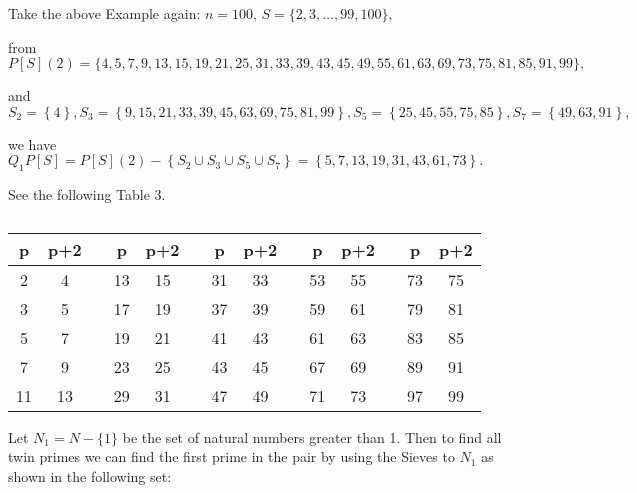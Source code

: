 \documentclass{aomart}
\begin{document}
\vspace{1\baselineskip}

Take the above Example again:  \( n = 100\),  \( S = \{ 2, 3, \ldots , 99, 100\} ,\)
\vspace{1\baselineskip}

from\ \ \ \ \( P\left[S\right]\left(2\right) = \{ 4,5,7,9,13,15,19,21,25,31,33,39,43,45,49,55,61,63,69,73,75,81,85,91,99\} ,\)
\vspace{1\baselineskip}

and\ \ \ \  \( S_{2} =\left\{ 4\right\} ,  S_{3} =\left\{ 9,15,21,33,39,45,63,69,75,81, 99\right\} ,  S_{5} =\left\{ 25,45,55,75,85\right\} ,  S_{7} =\left\{ 49,63,91\right\} ,\)
\vspace{1\baselineskip}

we have\ \ \ \ \ \ \ \ \(  Q_{1}P\left[S\right] = P\left[S\right](2)-\left\{ S_{2}\cup  S_{3}\cup  S_{5}\cup  S_{7}\right\}  =\left\{ 5, 7, 13, 19, 31, 43, 61, 73\right\} .\)

\vspace{2\baselineskip}

See the following Table 3.


\begin{table}[H]
\centering
\begin{tabular}{|c|c|c|c|c|c|c|c|c|c|c|c|c|c|}
\hline
p & p+2 &   & p & p+2 &   & p & p+2 &   & p & p+2 &   & p & p+2 \\ \hline
2 & \cellcolor{red!10} 4 &  & 13 & \cellcolor{red!30} 15 &  & 31 & \cellcolor{red!30} 33 &  & 53 & \cellcolor{red!50} 55 &  & 73 & \cellcolor{red!30} 75 \\ \hline
3 & 5 &  & 17 & 19 &  & 37 & \cellcolor{red!30} 39 &  & 59 & 61 &  & 79 & \cellcolor{red!30} 81 \\ \hline
5 & 7 &  & 19 & \cellcolor{red!30} 21 &  & 41 & 43 &  & 61 & \cellcolor{red!30} 63 &  & 83 & \cellcolor{red!50} 85 \\ \hline
7 & \cellcolor{red!30} 9 &  & 23 & \cellcolor{red!50} 25 &  & 43 & \cellcolor{red!30} 45 &  & 67 & \cellcolor{red!30} 69 &  & 89 & \cellcolor{red!70} 91 \\ \hline
11 & 13 &   & 29 & 31 &   & 47 & \cellcolor{red!70} 49 &   & 71 & 73 &   & 97 & \cellcolor{red!30} 99 \\ \hline
\end{tabular}
\caption{}
\end{table}




Let \( N_{1} =  N - \{ 1\}\) be the set of natural numbers greater than 1. Then to find all twin primes we can find the first prime in the pair by using  {the Sieves to} \( N_{1}\) as shown in the following set:
\end{document}

